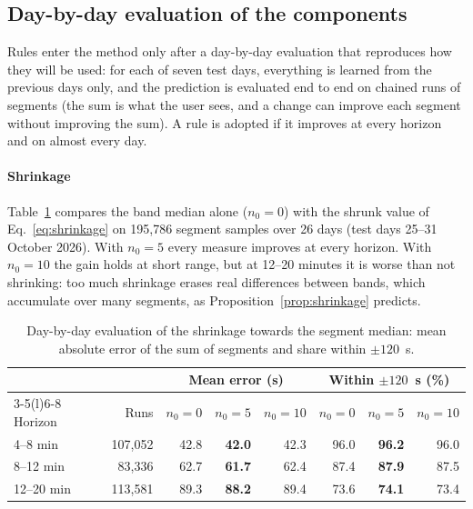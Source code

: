 
\subsection{Day-by-day evaluation of the components}
\label{sec:day-by-day}

Rules enter the method only after a day-by-day evaluation that reproduces how they will be used: for each of seven
test days, everything is learned from the previous days only, and the prediction is evaluated end to end on chained
runs of segments (the sum is what the user sees, and a change can improve each segment without improving the sum).
A rule is adopted if it improves at every horizon and on almost every day.

\paragraph{Shrinkage} Table~\ref{tab:shrinkage} compares the band median alone ($n_0=0$) with the shrunk value of
Eq.~\eqref{eq:shrinkage} on 195,786 segment samples over 26 days (test days 25--31 October 2026). With $n_0=5$ every
measure improves at every horizon. With $n_0=10$ the gain holds at short range, but at 12--20 minutes it is worse than
not shrinking: too much shrinkage erases real differences between bands, which accumulate over many segments, as
Proposition~\ref{prop:shrinkage} predicts.

\begin{table}[t]
\centering
\caption{Day-by-day evaluation of the shrinkage towards the segment median: mean absolute error of the sum of
segments and share within $\pm120$~s.}
\label{tab:shrinkage}
\small
\begin{tabular}{@{}lrrrrrrr@{}}
\toprule
& & \multicolumn{3}{c}{Mean error (s)} & \multicolumn{3}{c}{Within $\pm120$~s (\%)} \\
\cmidrule(lr){3-5}\cmidrule(l){6-8}
Horizon & Runs & $n_0=0$ & $n_0=5$ & $n_0=10$ & $n_0=0$ & $n_0=5$ & $n_0=10$ \\
\midrule
4--8 min   & 107,052 & 42.8 & \textbf{42.0} & 42.3 & 96.0 & \textbf{96.2} & 96.0 \\
8--12 min  & 83,336  & 62.7 & \textbf{61.7} & 62.4 & 87.4 & \textbf{87.9} & 87.5 \\
12--20 min & 113,581 & 89.3 & \textbf{88.2} & 89.4 & 73.6 & \textbf{74.1} & 73.4 \\
\bottomrule
\end{tabular}
\end{table}

